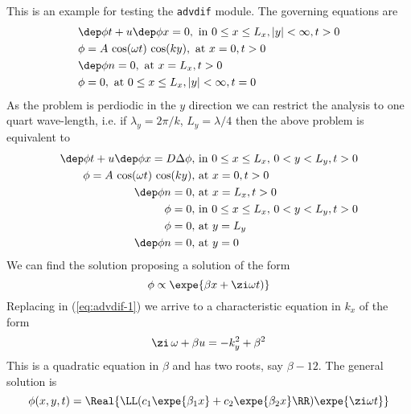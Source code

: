 
This is an example for testing the \verb+advdif+ module. The governing
equations are
%
\begin{equation}
\begin{aligned}
     &\dep\phi t + u\dep\phi x = 0, \text{ in } 0\le x\le L_x, |y|<\infty,t>0\\
     &\phi = A \, \cos(\omega t)\, \cos(k y), \text{ at } x=0,t>0\\
     &\dep\phi n = 0, \text{ at } x=L_x, t>0\\
     &\phi = 0, \text{ at } 0\le x\le L_x, |y|<\infty,t=0
\end{aligned}
\end{equation}
%
As the problem is perdiodic in the \(y\) direction we can restrict the
analysis to one quart wave-length, i.e. if \(\lambda_y=2\pi/k\),
\(L_y=\lambda/4\) then the above problem is equivalent to
%
\begin{equation}\label{eq:advdif-1}  
\begin{aligned}
     \dep\phi t + u\dep\phi x = D \Delta\phi,& \text{ in } 0\le x\le L_x,\, 0<y<L_y,t>0\\
     \phi = A \, \cos(\omega t)\, \cos (k y),& \text{ at } x=0,t>0\\
     \dep\phi n= 0,& \text{ at } x=L_x, t>0\\
     \phi = 0,& \text{ in } 0\le x\le L_x,\, 0<y<L_y,t>0\\
     \phi = 0,&  \text{ at } y=L_y\\
     \dep\phi n = 0,&  \text{ at } y=0
\end{aligned}
\end{equation}
%
We can find the solution proposing a solution of the form
%
\[ \phi \propto \expe{\beta x +\zi \omega t)} \]
%
Replacing in (\ref{eq:advdif-1}) we arrive to a characteristic
equation in \(k_x\) of the form
%
\begin{equation} 
   \zi \, \omega +\beta u = -k_y^2 +\beta^2
\end{equation}
%
This is a quadratic equation in $\beta$ and has two roots, say
$\beta-{12}$. The general solution is
%
\[ \phi(x,y,t) = \Real{\LL(c_1 \expe{\beta_1 x} 
         +c_2 \expe{\beta_2 x}\RR)   \expe{\zi \omega t}} \]
  

